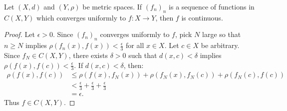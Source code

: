     \begin{theorem}
        Let $(X,d)$ and $(Y,\rho)$ be metric spaces. If $(f_n)_n$ is a sequence of functions in $C(X,Y)$ which converges uniformly to $f:X \rightarrow Y$, then $f$ is continuous.
    \end{theorem}
        \begin{proof}
            Let $\epsilon > 0$. Since $(f_n)_n$ converges uniformly to $f$, pick $N$ large so that $n \geq N$ implies $\rho(f_n(x),f(x)) < \frac{\epsilon}{3}$ for all $x \in X$. Let $c \in X$ be arbitrary. Since $f_N \in C(X,Y)$, there exists $\delta > 0$ such that $d(x,c) < \delta$ implies $\rho(f(x),f(c)) < \frac{\epsilon}{3}$. If $d(x,c) < \delta$, then:
                \begin{equation*}
                \begin{split}
                    \rho(f(x),f(c)) 
                    & \leq \rho(f(x),f_N(x)) + \rho(f_N(x),f_N(c)) + \rho(f_N(c),f(c)) \\
                    & < \frac{\epsilon}{3} + \frac{\epsilon}{3} + \frac{\epsilon}{3} \\
                    & = \epsilon.
                \end{split}
                \end{equation*}
            Thus $f \in C(X,Y)$.
        \end{proof}



